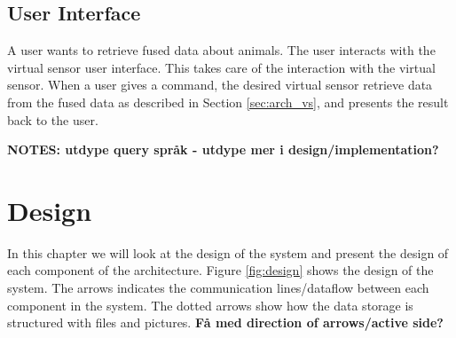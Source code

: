 \documentclass[USenglish]{uit-thesis}
\begin{document}


\section{User Interface} \label{sec:arch_user_int}
A user wants to retrieve fused data about animals. The user interacts with the virtual sensor user interface. This takes care of the interaction with the virtual sensor. When a user gives a command, the desired virtual sensor retrieve data from the fused data as described in Section \ref{sec:arch_vs}, and presents the result back to the user.

\textbf{NOTES: utdype query språk - utdype mer i design/implementation?}



\chapter{Design}

In this chapter we will look at the design of the system and present the design of each component of the architecture. Figure \ref{fig:design} shows the design of the system. The arrows indicates the communication lines/dataflow between each component in the system. The dotted arrows show how the data storage is structured with files and pictures. \textbf{Få med direction of arrows/active side?}

\end{document}
